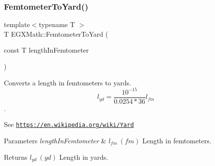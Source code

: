 \subsubsection{\texorpdfstring{Femtometer\+To\+Yard()}{FemtometerToYard()}}
{\footnotesize\ttfamily template$<$typename T $>$ \\
T E\+G\+X\+Math\+::\+Femtometer\+To\+Yard (\begin{DoxyParamCaption}\item[{const T}]{length\+In\+Femtometer }\end{DoxyParamCaption})}



Converts a length in femtometers to yards. \[ l_{yd}= \frac{10^{-15}}{0.0254 * 36} l_{fm} \]. 

See \href{https://en.wikipedia.org/wiki/Yard}{\tt https\+://en.\+wikipedia.\+org/wiki/\+Yard} 
\begin{DoxyParams}{Parameters}
{\em length\+In\+Femtometer} & $ l_{fm}\ (fm)$ Length in femtometers. \\
\hline
\end{DoxyParams}
\begin{DoxyReturn}{Returns}
$ l_{yd}\ (yd)$ Length in yards. 
\end{DoxyReturn}
